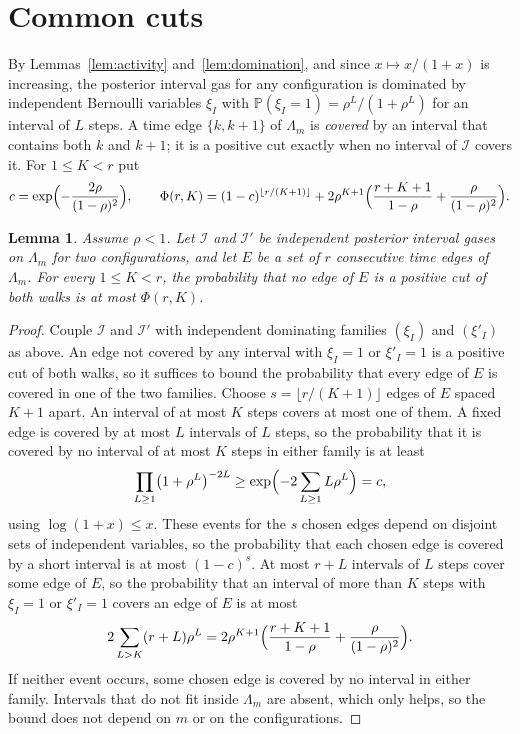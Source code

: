 \documentclass[11pt]{amsart}
\newtheorem{lemma}[theorem]{Lemma}
\theoremstyle{remark}
\newcommand{\PP}{\mathbb{P}}
\begin{document}
\section{Common cuts}\label{sec:common}

By Lemmas~\ref{lem:activity} and~\ref{lem:domination}, and since $x\mapsto x/(1+x)$ is increasing, the posterior
interval gas for any configuration is dominated by independent Bernoulli variables $\xi_I$ with
$\PP(\xi_I=1)=\rho^L/(1+\rho^L)$ for an interval of $L$ steps. A time edge $\{k,k+1\}$ of $\Lambda_m$ is \emph{covered}
by an interval that contains both $k$ and $k+1$; it is a positive cut exactly when no interval of $\mathcal I$ covers it.
For $1\le K<r$ put
\begin{equation}\label{eq:bound}
c=\exp\Bigl(-\frac{2\rho}{(1-\rho)^2}\Bigr),\qquad
\Phi(r,K)=(1-c)^{\lfloor r/(K+1)\rfloor}
+2\rho^{K+1}\Bigl(\frac{r+K+1}{1-\rho}+\frac{\rho}{(1-\rho)^2}\Bigr).
\end{equation}

\begin{lemma}\label{lem:common}
Assume $\rho<1$. Let $\mathcal I$ and $\mathcal I'$ be independent posterior interval gases on $\Lambda_m$ for two
configurations, and let $E$ be a set of $r$ consecutive time edges of $\Lambda_m$. For every $1\le K<r$, the probability
that no edge of $E$ is a positive cut of both walks is at most $\Phi(r,K)$.
\end{lemma}

\begin{proof}
Couple $\mathcal I$ and $\mathcal I'$ with independent dominating families $(\xi_I)$ and $(\xi'_I)$ as above. An edge
not covered by any interval with $\xi_I=1$ or $\xi'_I=1$ is a positive cut of both walks, so it suffices to bound the
probability that every edge of $E$ is covered in one of the two families. Choose $s=\lfloor r/(K+1)\rfloor$ edges of $E$
spaced $K+1$ apart. An interval of at most $K$ steps covers at most one of them. A fixed edge is covered by at most $L$
intervals of $L$ steps, so the probability that it is covered by no interval of at most $K$ steps in either family is
at least
\[
\prod_{L\ge1}\bigl(1+\rho^L\bigr)^{-2L}\ge\exp\Bigl(-2\sum_{L\ge1}L\rho^L\Bigr)=c ,
\]
using $\log(1+x)\le x$. These events for the $s$ chosen edges depend on disjoint sets of independent variables, so the
probability that each chosen edge is covered by a short interval is at most $(1-c)^s$. At most $r+L$ intervals of $L$
steps cover some edge of $E$, so the probability that an interval of more than $K$ steps with $\xi_I=1$ or $\xi'_I=1$
covers an edge of $E$ is at most
\[
2\sum_{L>K}(r+L)\rho^L=2\rho^{K+1}\Bigl(\frac{r+K+1}{1-\rho}+\frac{\rho}{(1-\rho)^2}\Bigr).
\]
If neither event occurs, some chosen edge is covered by no interval in either family. Intervals that do not fit inside
$\Lambda_m$ are absent, which only helps, so the bound does not depend on $m$ or on the configurations.
\end{proof}
\end{document}
